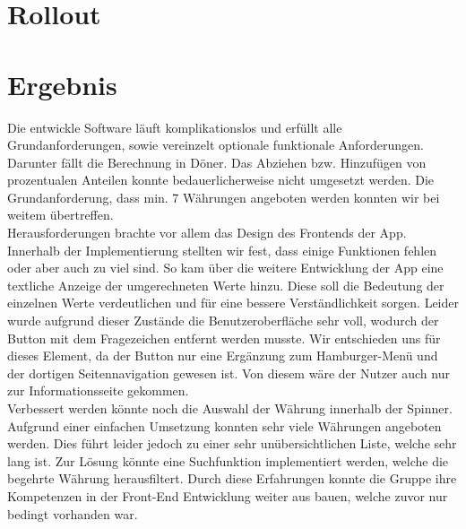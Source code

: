 \documentclass[conference]{IEEEtran}
\begin{document}
\section{Rollout}

\section{Ergebnis}

Die entwickle Software läuft komplikationslos und erfüllt alle Grundanforderungen, sowie vereinzelt optionale funktionale Anforderungen. Darunter fällt die Berechnung in Döner.  Das Abziehen bzw. Hinzufügen von prozentualen Anteilen konnte bedauerlicherweise nicht umgesetzt werden. Die Grundanforderung, dass min. 7 Währungen angeboten werden konnten wir bei weitem übertreffen.\\
Herausforderungen brachte vor allem das Design des Frontends der App. Innerhalb der Implementierung stellten wir fest, dass einige Funktionen fehlen oder aber auch zu viel sind. So kam über die weitere Entwicklung der App eine textliche Anzeige der umgerechneten Werte hinzu. Diese soll die Bedeutung der einzelnen Werte verdeutlichen und für eine bessere Verständlichkeit sorgen. Leider wurde aufgrund dieser Zustände die Benutzeroberfläche sehr voll, wodurch der Button mit dem Fragezeichen entfernt werden musste. Wir entschieden uns für dieses Element, da der Button nur eine Ergänzung zum Hamburger-Menü und der dortigen Seitennavigation gewesen ist. Von diesem wäre der Nutzer auch nur zur Informationsseite gekommen. \\
Verbessert werden könnte noch die Auswahl der Währung innerhalb der Spinner. Aufgrund einer einfachen Umsetzung konnten sehr viele Währungen angeboten werden. Dies führt leider jedoch zu einer sehr unübersichtlichen Liste, welche sehr lang ist. Zur Lösung könnte eine Suchfunktion implementiert werden, welche die begehrte Währung herausfiltert. Durch diese Erfahrungen konnte die Gruppe ihre Kompetenzen in der Front-End Entwicklung weiter aus bauen, welche zuvor nur bedingt vorhanden war.
\end{document}

